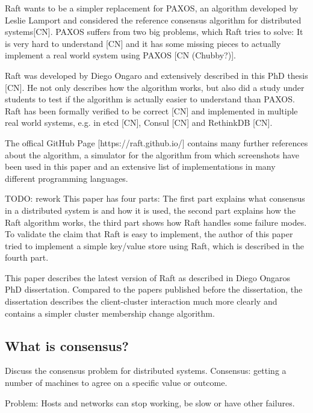Raft wants to be a simpler replacement for PAXOS, an algorithm developed by Leslie Lamport and considered the reference consensus algorithm for distributed systems[CN]. PAXOS suffers from two big problems, which Raft tries to solve: It is very hard to understand [CN] and it has some missing pieces to actually implement a real world system using PAXOS [CN (Chubby?)].

Raft was developed by Diego Ongaro and extensively described in this PhD thesis [CN]. He not only describes how the algorithm works, but also did a study under students to test if the algorithm is actually easier to understand than PAXOS. Raft has been formally verified to be correct [CN] and implemented in multiple real world systems, e.g. in etcd [CN], Consul [CN] and RethinkDB [CN].

The offical GitHub Page [https://raft.github.io/] contains many further references about the algorithm, a simulator for the algorithm from which screenshots have been used in this paper and an extensive list of implementations in many different programming languages.

TODO: rework
This paper has four parts: The first part explains what consensus in a distributed system is and how it is used, the second part explains how the Raft algorithm works, the third part shows how Raft handles some failure modes. To validate the claim that Raft is easy to implement, the author of this paper tried to implement a simple key/value store using Raft, which is described in the fourth part.

This paper describes the latest version of Raft as described in Diego Ongaros PhD dissertation. Compared to the papers published before the dissertation, the dissertation describes the client-cluster interaction much more clearly and contains a simpler cluster membership change algorithm.

\subsection{What is consensus?}










Discuss the consensus problem for distributed systems.
Consensus: getting a number of machines to agree on a specific value or outcome.

Problem: Hosts and networks can stop working, be slow or have other failures.







